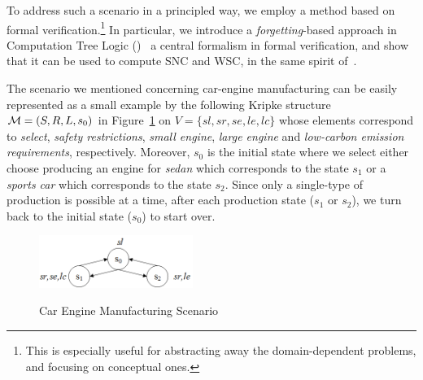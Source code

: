 \documentclass[letterpaper]{article} %
\begin{document}
To address such a scenario in a principled way, we employ a  method based on formal verification.\footnote{ This is  especially useful for abstracting away the domain-dependent problems, and focusing on conceptual ones.} In particular,
we introduce a \emph{forgetting}-based approach in Computation Tree Logic (\CTL)~\cite{clarke1981design}
a central formalism in formal verification, and show that it can
be used to compute SNC and WSC, in the same spirit of~\cite{DBLP:journals/ai/Lin01}.


The scenario we mentioned concerning car-engine manufacturing can be easily represented  as a small example by the following Kripke structure ${\cal M}=(S, R, L, s_0)$ in Figure~\ref{BVM} on $V=\{ sl, sr, se, le, lc\}$ whose elements correspond to  \emph{select},  \emph{safety restrictions}, \emph{small engine},  \emph{large engine} and \emph{low-carbon emission requirements}, respectively. Moreover, $s_0$ is the initial state where we select either choose producing an engine for \emph{sedan} which corresponds to the state $s_1$ or a \emph{sports car} which corresponds to the state $s_2$.
Since only a single-type of production is possible at a time, after each production state ($s_1$ or $s_2$), we turn back to the initial state ($s_0$) to start over.
\begin{figure}[ht]
  \centering
  \includegraphics[width=5cm]{BVM.png}\\
  \caption{Car Engine Manufacturing Scenario }\label{BVM}
\end{figure}






\end{document}

